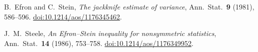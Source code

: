 B.~Efron and C.~Stein, \emph{The jackknife estimate of variance}, Ann.\
Stat.\ \textbf{9} (1981), 586--596.
\href{https://doi.org/10.1214/aos/1176345462}{doi:10.1214/aos/1176345462}.

J.~M.~Steele, \emph{An Efron--Stein inequality for nonsymmetric statistics}, Ann.\
Stat.\ \textbf{14} (1986), 753--758.
\href{https://doi.org/10.1214/aos/1176349952}{doi:10.1214/aos/1176349952}.
